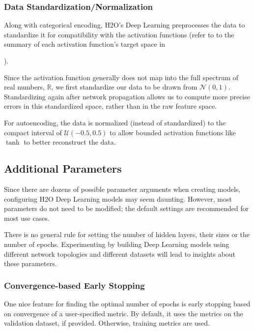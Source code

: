 \subsubsection{Data Standardization/Normalization} 

Along with categorical encoding, H2O's Deep Learning preprocesses the data to standardize it for compatibility with the activation functions (refer to to the summary of each activation function's target space in {\textbf{}). 

Since the activation function generally does not  map into the full spectrum of real numbers, $\mathbb{R}$, we first standardize our data to be drawn from $\mathcal{N}(0,1)$. Standardizing again after network propagation allows us to compute more precise errors in this standardized space, rather than in the raw feature space. 

For autoencoding, the data is normalized (instead of standardized) to the compact interval of $\mathcal{U}(-0.5,0.5)$ to allow bounded activation functions like $\tanh$ to better reconstruct the data.


\subsection{Additional Parameters} 

Since there are dozens of possible parameter arguments when creating models, configuring H2O Deep Learning models may seem daunting. However, most parameters do not need to be modified; the default settings are recommended for most use cases. 

There is no general rule for setting the number of hidden layers, their sizes or the number of epochs. Experimenting by building Deep Learning models using different network topologies and different datasets will lead to insights about these parameters.

\subsubsection{Convergence-based Early Stopping}
One nice feature for finding the optimal number of epochs is early stopping based on convergence of a user-specified metric. By default, it uses the metrics on the validation dataset, if provided. Otherwise, training metrics are used.

}
